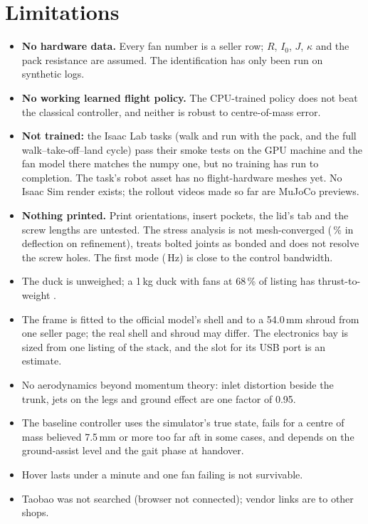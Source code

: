 \documentclass[11pt]{article}
\begin{document}
\section{Limitations}\label{sec:lim}
\begin{itemize}
\item \textbf{No hardware data.} Every fan number is a seller row; $R$, $I_0$, $J$, $\kappa$ and the
pack resistance are assumed. The identification has only been run on synthetic logs.
\item \textbf{No working learned flight policy.} The CPU-trained policy does not beat the classical controller, and neither is robust to centre-of-mass error.
\item \textbf{Not trained:} the Isaac Lab tasks (walk and run with the pack, and the full walk--take-off--land
cycle) pass their smoke tests on the GPU machine and the fan model there matches the numpy one, but no training has
run to completion. The task's robot asset has no flight-hardware meshes yet. No Isaac Sim render exists; the
rollout videos made so far are MuJoCo previews.
\item \textbf{Nothing printed.} Print orientations, insert pockets, the lid's tab and the screw lengths are untested.
The stress analysis is not mesh-converged (\frStConvDefl\,\% in deflection on refinement), treats bolted joints as
bonded and does not resolve the screw holes. The first mode (\frStMode\,Hz) is close to the control bandwidth.
\item The duck is unweighed; a 1\,kg duck with fans at 68\,\% of listing has thrust-to-weight \flTwLow.
\item The frame is fitted to the official model's shell and to a 54.0\,mm shroud from one seller
page; the real shell and shroud may differ. The electronics bay is sized from one listing of the stack, and the
slot for its USB port is an estimate.
\item No aerodynamics beyond momentum theory: inlet distortion beside the trunk, jets on the legs and
ground effect are one factor of 0.95.
\item The baseline controller uses the simulator's true state, fails for a centre of mass believed
7.5\,mm or more too far aft in some cases, and depends on the ground-assist level and the gait phase at handover.
\item Hover lasts under a minute and one fan failing is not survivable.
\item Taobao was not searched (browser not connected); vendor links are to other shops.
\end{itemize}
\end{document}
